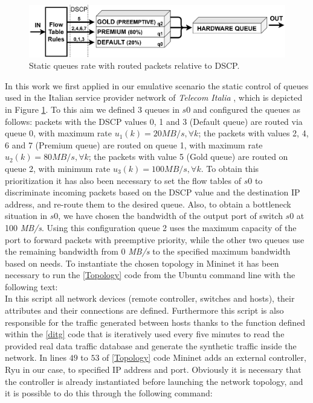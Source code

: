 \begin{figure}[tb!]
	\centering
	\includegraphics[keepaspectratio,width=\columnwidth]{figure/QUEUE.eps}
	\caption{Static queues rate with routed packets relative to DSCP.}
	\label{fig:{queue}}
\end{figure}

In this work we first applied in our emulative scenario the static control of queues used in the Italian service provider network of \textit{Telecom Italia} \cite{Notiziario}, which is depicted in Figure \ref{fig:{queue}}. To this aim we defined 3 queues in $s0$ and configured the queues as follows: packets with the DSCP values 0, 1 and 3 (Default queue) are routed via queue 0, with maximum rate $u_1(k) = 20 \textit{MB/s}, \forall k$; the packets with values 2, 4, 6 and 7 (Premium queue) are routed on queue 1, with maximum rate $u_2(k) = 80 \textit{MB/s}, \forall k$; the packets with value 5 (Gold queue) are routed on queue 2, with minimum rate $u_3(k) = 100 \textit{MB/s}, \forall k$. To obtain this prioritization it has also been necessary to set the flow tables of $s0$ to discriminate incoming packets based on the DSCP value and the destination IP address, and re-route them to the desired queue. Also, to obtain a bottleneck situation in $s0$, we have chosen the bandwidth of the output port of switch $s0$ at 100 \textit{MB/s}. Using this configuration queue 2 uses the maximum capacity of the port to forward packets with preemptive priority, while the other two queues use the remaining bandwidth from 0 \textit{MB/s} to the specified maximum bandwidth based on needs.
To instantiate the chosen topology in Mininet it has been necessary to run the \ref{Topology} code from the Ubuntu command line with the following text:\\
In this script all network devices (remote controller, switches and hosts), their attributes and their connections are defined. Furthermore this script is also responsible for the traffic generated between hosts thanks to the function defined within the \ref{ditg} code that is iteratively used every five minutes to read the provided real data traffic database and generate the synthetic traffic inside the network. In lines $49$ to $53$ of \ref{Topology} code Mininet adds an external controller, Ryu in our case, to specified IP address and port. Obviously it is necessary that the controller is already instantiated before launching the network topology, and it is possible to do this through the following command:
